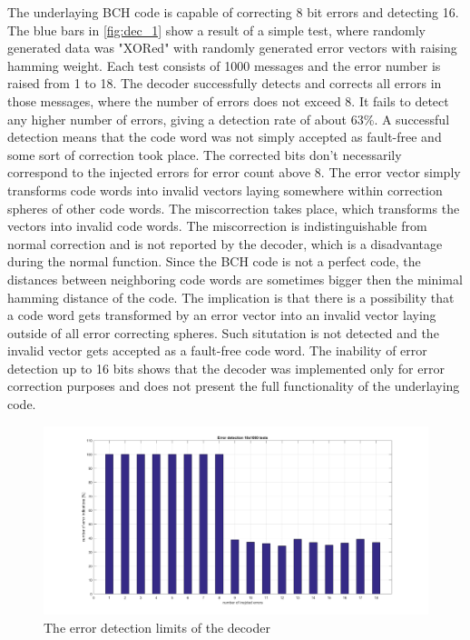 The underlaying BCH code is capable of correcting 8 bit errors and detecting 16. The blue bars in \autoref{fig:dec_1} show a result of a simple test, where randomly generated data was "XORed" with randomly generated error vectors with raising hamming weight. Each test consists of 1000 messages and the error number is raised from 1 to 18. The decoder successfully detects and corrects all errors in those messages, where the number of errors does not exceed 8. It fails to detect any higher number of errors, giving a detection rate of about 63\%. A successful detection means that the code word was not simply accepted as fault-free and some sort of correction took place. The corrected bits don't necessarily correspond to the injected errors for error count above 8. The error vector simply transforms code words into invalid vectors laying somewhere within correction spheres of other code words. The miscorrection takes place, which transforms the vectors into invalid code words. The miscorrection is indistinguishable from normal correction and is not reported by the decoder, which is a disadvantage during the normal function. Since the BCH code is not a perfect code, the distances between neighboring code words are sometimes bigger then the minimal hamming distance of the code. The implication is that there is a possibility that a code word gets transformed by an error vector into an invalid vector laying outside of all error correcting spheres. Such situtation is not detected and the invalid vector gets accepted as a fault-free code word. The inability of error detection up to 16 bits shows that the decoder was implemented only for error correction purposes and does not present the full functionality of the underlaying code.

\begin{figure}[h]
\centering
\includegraphics[width=\textwidth]{figures/1000_tests_error_detection.png}
\caption{The error detection limits of the decoder}
\label{fig:dec_1}
\end{figure}

